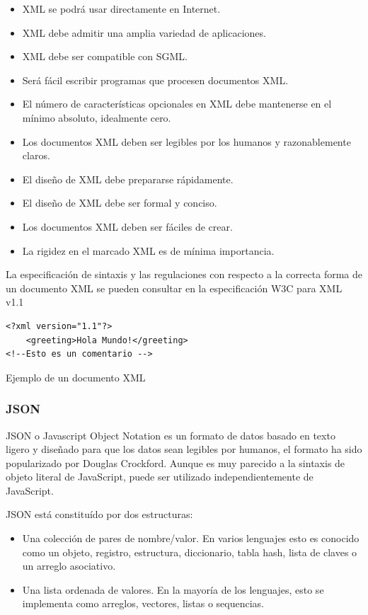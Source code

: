 \begin{itemize}
    \item XML se podrá usar directamente en Internet.
    \item XML debe admitir una amplia variedad de aplicaciones.
    \item XML debe ser compatible con SGML.
    \item Será fácil escribir programas que procesen documentos XML.
    \item El número de características opcionales en XML debe mantenerse en el mínimo absoluto, idealmente cero.
    \item Los documentos XML deben ser legibles por los humanos y razonablemente claros.
    \item El diseño de XML debe prepararse rápidamente.
    \item El diseño de XML debe ser formal y conciso.
    \item Los documentos XML deben ser fáciles de crear.
    \item La rigidez en el marcado XML es de mínima importancia.
\end{itemize}

La especificación de sintaxis y las regulaciones con respecto a la correcta forma de un documento XML se pueden consultar en la especificación W3C para XML v1.1

\begin{verbatim}
<?xml version="1.1"?> 
    <greeting>Hola Mundo!</greeting> 
<!--Esto es un comentario -->
\end{verbatim}
\begin{center}
    \caption{Ejemplo de un documento XML}    
\end{center}



\subsubsection{JSON}
JSON o Javascript Object Notation es un formato de datos basado en texto ligero y diseñado para que los datos sean legibles por humanos, el formato ha sido popularizado por Douglas Crockford.  Aunque es muy parecido a la sintaxis de objeto literal de JavaScript, puede ser utilizado independientemente de JavaScript.

JSON está constituído por dos estructuras:

\begin{itemize}
    \item Una colección de pares de nombre/valor. En varios lenguajes esto es conocido como un objeto, registro, estructura, diccionario, tabla hash, lista de claves o un arreglo asociativo.
    \item Una lista ordenada de valores. En la mayoría de los lenguajes, esto se implementa como arreglos, vectores, listas o sequencias.
\end{itemize}

